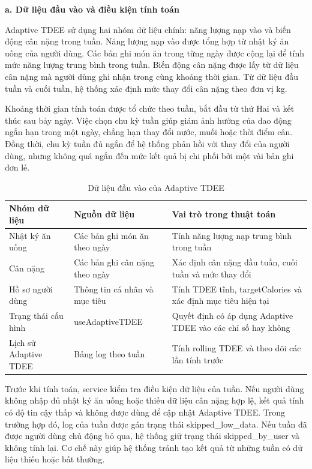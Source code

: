 \textbf{a. Dữ liệu đầu vào và điều kiện tính toán}

Adaptive TDEE sử dụng hai nhóm dữ liệu chính: năng lượng nạp vào và biến động cân nặng trong tuần. Năng lượng nạp vào được tổng hợp từ nhật ký ăn uống của người dùng. Các bản ghi món ăn trong từng ngày được cộng lại để tính mức năng lượng trung bình trong tuần. Biến động cân nặng được lấy từ dữ liệu cân nặng mà người dùng ghi nhận trong cùng khoảng thời gian. Từ dữ liệu đầu tuần và cuối tuần, hệ thống xác định mức thay đổi cân nặng theo đơn vị kg.

Khoảng thời gian tính toán được tổ chức theo tuần, bắt đầu từ thứ Hai và kết thúc sau bảy ngày. Việc chọn chu kỳ tuần giúp giảm ảnh hưởng của dao động ngắn hạn trong một ngày, chẳng hạn thay đổi nước, muối hoặc thời điểm cân. Đồng thời, chu kỳ tuần đủ ngắn để hệ thống phản hồi với thay đổi của người dùng, nhưng không quá ngắn đến mức kết quả bị chi phối bởi một vài bản ghi đơn lẻ.

\begin{table}[H]
\centering
\caption{Dữ liệu đầu vào của Adaptive TDEE}
\begin{tabular}{|p{4cm}|p{5.5cm}|p{5.5cm}|}
\hline
\textbf{Nhóm dữ liệu} & \textbf{Nguồn dữ liệu} & \textbf{Vai trò trong thuật toán} \\ \hline
Nhật ký ăn uống & Các bản ghi món ăn theo ngày & Tính năng lượng nạp trung bình trong tuần \\ \hline
Cân nặng & Các bản ghi cân nặng theo ngày & Xác định cân nặng đầu tuần, cuối tuần và mức thay đổi \\ \hline
Hồ sơ người dùng & Thông tin cá nhân và mục tiêu & Tính TDEE tĩnh, targetCalories và xác định mục tiêu hiện tại \\ \hline
Trạng thái cấu hình & useAdaptiveTDEE & Quyết định có áp dụng Adaptive TDEE vào các chỉ số hay không \\ \hline
Lịch sử Adaptive TDEE & Bảng log theo tuần & Tính rolling TDEE và theo dõi các lần tính trước \\ \hline
\end{tabular}
\end{table}

Trước khi tính toán, service kiểm tra điều kiện dữ liệu của tuần. Nếu người dùng không nhập đủ nhật ký ăn uống hoặc thiếu dữ liệu cân nặng hợp lệ, kết quả tính có độ tin cậy thấp và không được dùng để cập nhật Adaptive TDEE. Trong trường hợp đó, log của tuần được gán trạng thái skipped\_low\_data. Nếu tuần đã được người dùng chủ động bỏ qua, hệ thống giữ trạng thái skipped\_by\_user và không tính lại. Cơ chế này giúp hệ thống tránh tạo kết quả từ những tuần có dữ liệu thiếu hoặc bất thường.

